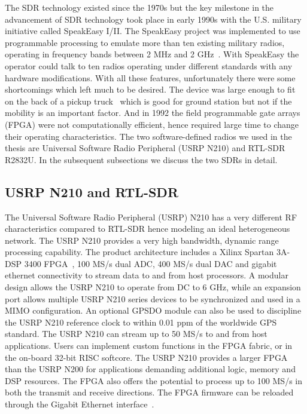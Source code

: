 The SDR technology existed since the 1970s but the key milestone in the advancement of SDR technology took place in early 1990s with the U.S. military initiative called SpeakEasy I/II. The SpeakEasy project was implemented to use programmable processing to emulate more than ten existing military radios, operating in frequency bands between 2 MHz and 2 GHz~\cite{392998}. With SpeakEasy the operator could talk to ten radios operating under different standards with any hardware modifications. With all these features, unfortunately there were some shortcomings which left much to be desired. The device was large enough to fit on the back of a pickup truck~\cite{392998} which is good for ground station but not if the mobility is an important factor. And in 1992 the field programmable gate arrays (FPGA) were not computationally efficient, hence required large time to change their operating characteristics. The two software-defined radios we used in the thesis are Universal Software Radio Peripheral (USRP N210) and RTL-SDR R2832U. In the subsequent subsections we discuss the two SDRs in detail.

\subsection{USRP N210 and RTL-SDR}

The Universal Software Radio Peripheral (USRP) N210 has a very different RF characteristics compared to RTL-SDR hence modeling an ideal heterogeneous network. The USRP N210 provides a very high bandwidth, dynamic range processing capability. The product architecture includes a Xilinx Spartan 3A-DSP 3400 FPGA~\cite{xilinx}, 100 MS/s dual ADC, 400 MS/s dual DAC and gigabit ethernet connectivity to stream data to and from host processors. A modular design allows the USRP N210 to operate from DC to 6 GHz, while an expansion port allows multiple USRP N210 series devices to be synchronized and used in a MIMO configuration. An optional GPSDO module can also be used to discipline the USRP N210 reference clock to within 0.01 ppm of the worldwide GPS standard. The USRP N210 can stream up to 50 MS/s to and from host applications. Users can implement custom functions in the FPGA fabric, or in the on-board 32-bit RISC softcore. The USRP N210 provides a larger FPGA than the USRP N200 for applications demanding additional logic, memory and DSP resources. The FPGA also offers the potential to process up to 100 MS/s in both the transmit and receive directions. The FPGA firmware can be reloaded through the Gigabit Ethernet interface~\cite{usrp}.

